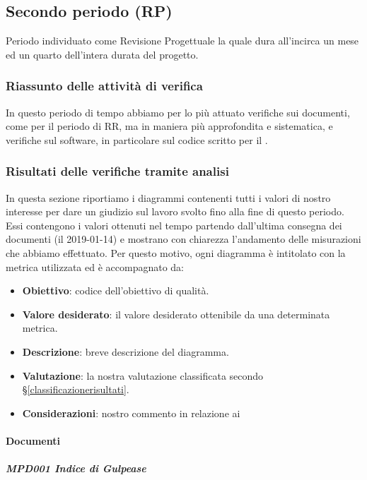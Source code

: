 	\subsection{Secondo periodo (RP)}
	Periodo individuato come Revisione Progettuale la quale dura all'incirca un mese ed un quarto dell'intera durata del progetto.
	
	\subsubsection{Riassunto delle attività di verifica}
	In questo periodo di tempo abbiamo per lo più attuato verifiche sui documenti, come per il periodo di RR, ma in maniera più approfondita e  sistematica, e verifiche sul software, in particolare sul codice scritto per il .

	
	\subsubsection{Risultati delle verifiche tramite analisi}
	In questa sezione riportiamo i diagrammi contenenti tutti i valori di nostro interesse per dare un giudizio sul lavoro svolto fino alla fine di questo periodo.
	Essi contengono i valori ottenuti nel tempo partendo dall'ultima consegna dei documenti (il 2019-01-14) e mostrano con chiarezza l'andamento delle misurazioni che abbiamo effettuato.
	Per questo motivo, ogni diagramma è intitolato con la metrica utilizzata ed è accompagnato da:
	\begin{itemize}
		\item \textbf{Obiettivo}: codice dell'obiettivo di qualità.
		\item \textbf{Valore desiderato}: il valore desiderato ottenibile da una determinata metrica.
		\item \textbf{Descrizione}: breve descrizione del diagramma.
		\item \textbf{Valutazione}: la nostra valutazione classificata secondo \S\ref{classificazionerisultati}.
		\item \textbf{Considerazioni}: nostro commento in relazione ai 
	\end{itemize}


	\paragraph{Documenti}

	\subparagraph{MPD001 Indice di Gulpease}

